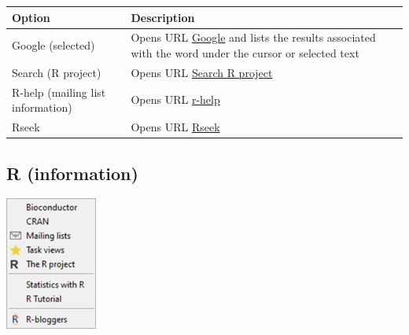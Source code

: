 \begin{scriptsize}
  \begin{tabularx}{\textwidth}{>{\hsize=0.5\hsize}X>{\hsize=0.7\hsize}X}\\
    \hline
    \textbf{Option} & \textbf{Description} \\
    \hline
    Google (selected) & Opens URL
     \href{http://www.google.com/webhp?domains=r-project.org\&sitesearch=r-project.org\&btnG=Google+Search}
     {Google} and lists the results associated with the word under the cursor or selected text \\
    Search (R project) & Opens URL \href{https://search.r-project.org/}{Search R project} \\
    \hdashline[1pt/1pt]
    R-help (mailing list information) & Opens URL
     \href{http://www.mail-archive.com/r-help@stat.math.ethz.ch/info.html}{r-help} \\
    Rseek & Opens URL \href{http://www.rseek.org/}{Rseek} \\
    \hline
  \end{tabularx}
\end{scriptsize}


\hypertarget{menu_web_rinformation}{}
\subsection{R (information)}

\includegraphics[scale=0.8]{./res/menu_web_rinformation.png}\\

